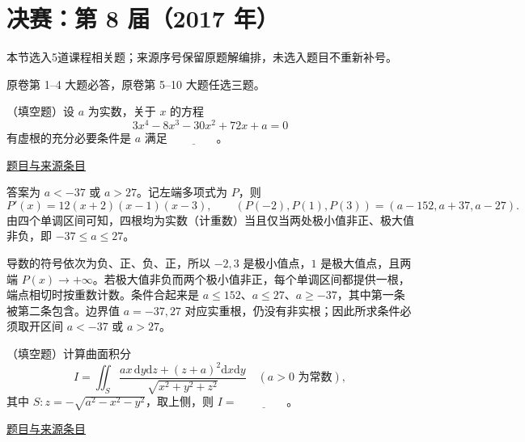 \documentclass[UTF8,12pt,a4paper,fontset=fandol]{ctexart}
\begin{document}
\section{决赛：第 8 届（2017 年）}

本节选入5道课程相关题；来源序号保留原题解编排，未选入题目不重新补号。

\begin{remark}[来源说明]原卷第 1--4 大题必答，原卷第 5--10 大题任选三题。\end{remark}

\begin{example}[来源序号2]\label{ex:fin08-hi:2}\label{pr:fin08-hi:2}

（填空题）设 $a$ 为实数，关于 $x$ 的方程
\[
3x^{4}-8x^{3}-30x^{2}+72x+a=0
\]
有虚根的充分必要条件是 $a$ 满足 $\underline{\qquad\qquad}$。

\par\href{https://github.com/lzxcr/cmc-mathematics/blob/64916fa1fdbc3e444a652eca204d5669058ee321/src/problems/finals/08/02.md}{题目与来源条目}

\end{example}

\begin{solve}\label{ans:fin08-hi:2}

答案为 $a<-37$ 或 $a>27$。记左端多项式为 $P$，则
\[
P'(x)=12(x+2)(x-1)(x-3),\qquad(P(-2),P(1),P(3))=(a-152,a+37,a-27).
\]
由四个单调区间可知，四根均为实数（计重数）当且仅当两处极小值非正、极大值非负，即 $-37\leq a\leq27$。

导数的符号依次为负、正、负、正，所以 $-2,3$ 是极小值点，$1$ 是极大值点，且两端 $P(x)\to+\infty$。若极大值非负而两个极小值非正，每个单调区间都提供一根，端点相切时按重数计数。条件合起来是 $a\le152$、$a\le27$、$a\ge-37$，其中第一条被第二条包含。边界值 $a=-37,27$ 对应实重根，仍没有非实根；因此所求条件必须取开区间 $a<-37$ 或 $a>27$。

\end{solve}

\begin{example}[来源序号3]\label{ex:fin08-hi:3}\label{pr:fin08-hi:3}

（填空题）计算曲面积分
\[
I=\iint_{S}\frac{ax\,\mathrm{d}y\mathrm{d}z+\left(z+a\right)^{2}\mathrm{d}x\mathrm{d}y}{\sqrt{x^{2}+y^{2}+z^{2}}}\quad (a>0 \text{ 为常数}),
\]
其中 $S:z=-\sqrt{a^{2}-x^{2}-y^{2}}$，取上侧，则 $I=$ $\underline{\qquad\qquad}$。

\par\href{https://github.com/lzxcr/cmc-mathematics/blob/64916fa1fdbc3e444a652eca204d5669058ee321/src/problems/finals/08/03.md}{题目与来源条目}

\end{example}
\end{document}
